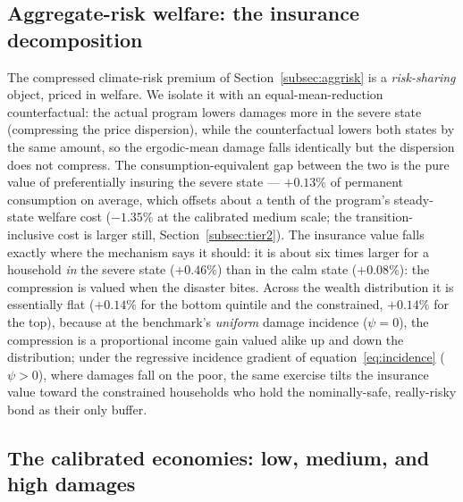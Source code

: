 \documentclass[12pt]{article}
\begin{document}
\subsection{Aggregate-risk welfare: the insurance decomposition}
\label{subsec:aggriskwelfare}

The compressed climate-risk premium of Section~\ref{subsec:aggrisk} is a
\emph{risk-sharing} object, priced in welfare. We isolate it with an
equal-mean-reduction counterfactual: the actual program lowers damages more in
the severe state (compressing the price dispersion), while the counterfactual
lowers both states by the same amount, so the ergodic-mean damage falls
identically but the dispersion does not compress. The consumption-equivalent gap
between the two is the pure value of preferentially insuring the severe
state --- $+0.13\%$ of permanent consumption on average, which offsets about a
tenth of the program's steady-state welfare cost ($-1.35\%$ at the calibrated
medium scale; the transition-inclusive cost is larger still,
Section~\ref{subsec:tier2}). The insurance value falls exactly where the
mechanism says it should: it is about six times larger for a household
\emph{in} the severe state ($+0.46\%$) than in the calm state ($+0.08\%$):
the compression is valued when the disaster bites. Across the wealth
distribution it is essentially flat ($+0.14\%$ for the bottom quintile and
the constrained, $+0.14\%$ for the top), because at the benchmark's
\emph{uniform} damage incidence ($\psi=0$), the compression is a proportional
income gain valued alike up and down the distribution; under the regressive
incidence gradient of equation~\eqref{eq:incidence}
($\psi>0$), where damages fall on the poor, the
same exercise tilts the insurance value toward the constrained households who
hold the nominally-safe, really-risky bond as their only buffer.

\subsection{The calibrated economies: low, medium, and high damages}
\label{subsec:calibrated}
\end{document}
